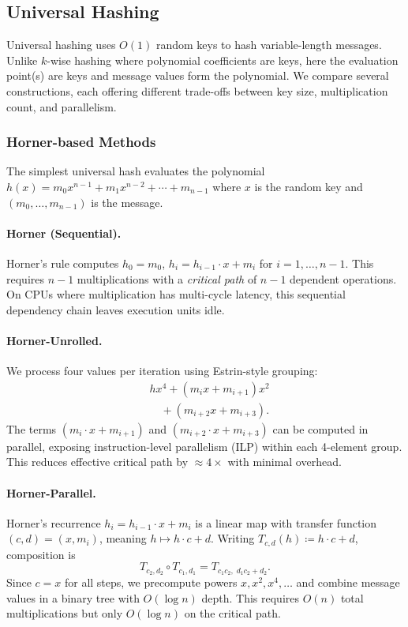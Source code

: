\subsection{Universal Hashing}
\label{sec:experiments:universal}

Universal hashing uses $O(1)$ random keys to hash variable-length messages.
Unlike $k$-wise hashing where polynomial coefficients are keys,
here the evaluation point(s) are keys and message values form the polynomial.
We compare several constructions, each offering different trade-offs between
key size, multiplication count, and parallelism.

\subsubsection{Horner-based Methods}

The simplest universal hash evaluates the polynomial
$h(x) = m_0 x^{n-1} + m_1 x^{n-2} + \cdots + m_{n-1}$
where $x$ is the random key and $(m_0, \ldots, m_{n-1})$ is the message.

\paragraph{Horner (Sequential).}
Horner's rule computes $h_0 = m_0$, $h_i = h_{i-1} \cdot x + m_i$ for $i = 1, \ldots, n-1$.
This requires $n-1$ multiplications with a \emph{critical path} of $n-1$ dependent operations.
On CPUs where multiplication has multi-cycle latency, this sequential
dependency chain leaves execution units idle.

\paragraph{Horner-Unrolled.}
We process four values per iteration using Estrin-style grouping:
\begin{align}
& h x^4 + (m_i x + m_{i+1}) x^2 \nonumber\\
&\quad + (m_{i+2} x + m_{i+3}). \nonumber
\end{align}
The terms $(m_i \cdot x + m_{i+1})$ and $(m_{i+2} \cdot x + m_{i+3})$ can be computed
in parallel, exposing instruction-level parallelism (ILP) within each 4-element group.
This reduces effective critical path by $\approx 4\times$ with minimal overhead.

\paragraph{Horner-Parallel.}
Horner's recurrence $h_i = h_{i-1} \cdot x + m_i$ is a linear map with transfer function
$(c, d) = (x, m_i)$, meaning $h \mapsto h \cdot c + d$.
Writing $T_{c,d}(h)\coloneqq h\cdot c + d$, composition is
\[
   T_{c_2,d_2}\!\circ T_{c_1,d_1} = T_{c_1c_2,\; d_1c_2 + d_2}.
\]
Since $c = x$ for all steps, we precompute powers $x, x^2, x^4, \ldots$ and combine
message values in a binary tree with $O(\log n)$ depth.
This requires $O(n)$ total multiplications but only $O(\log n)$ on the critical path.

